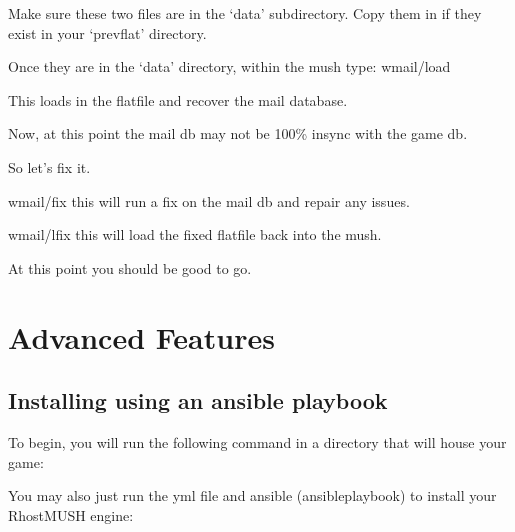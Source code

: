 \documentclass[letterpaper,10pt,english]{sphinxmanual}
\begin{document}
\sphinxAtStartPar
Make sure these two files are in the ‘data’ subdirectory.  Copy them in
if they exist in your ‘prevflat’ directory.

\sphinxAtStartPar
Once they are in the ‘data’ directory, within the mush type: wmail/load

\sphinxAtStartPar
This loads in the flatfile and recover the mail database.

\sphinxAtStartPar
Now, at this point the mail db may not be 100\% in\sphinxhyphen{}sync with the game db.

\sphinxAtStartPar
So let’s fix it.

\sphinxAtStartPar
wmail/fix   \textendash{} this will run a fix on the mail db and repair any issues.

\sphinxAtStartPar
wmail/lfix  \textendash{} this will load the fixed flatfile back into the mush.

\sphinxAtStartPar
At this point you should be good to go.


\chapter{Advanced Features}
\label{\detokenize{advanced:advanced-features}}\label{\detokenize{advanced::doc}}

\section{Installing using an ansible playbook}
\label{\detokenize{advanced:installing-using-an-ansible-playbook}}\label{\detokenize{advanced:ansible-install}}
\sphinxAtStartPar
To begin, you will run the following command in a directory that will house your game:

\begin{sphinxVerbatim}[commandchars=\\\{\}]
   
\end{sphinxVerbatim}

\sphinxAtStartPar
You may also just run the yml file and ansible (ansible\sphinxhyphen{}playbook) to install your RhostMUSH engine:

\begin{sphinxVerbatim}[commandchars=\\\{\}]
 
 
\end{sphinxVerbatim}
\end{document}
